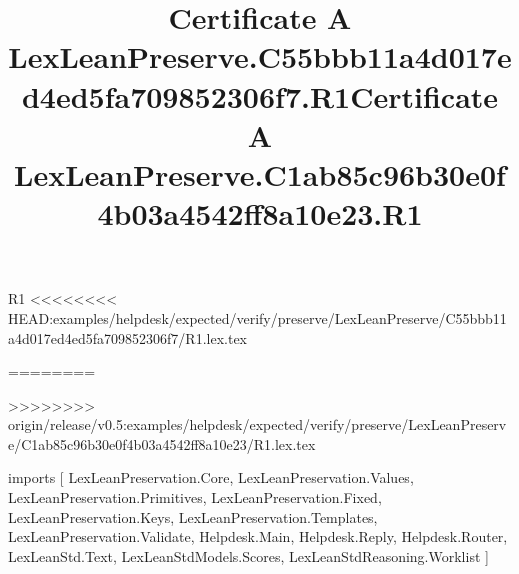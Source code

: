 \begin{lexlean}{R1}
<<<<<<<< HEAD:examples/helpdesk/expected/verify/preserve/LexLeanPreserve/C55bbb11a4d017ed4ed5fa709852306f7/R1.lex.tex
\title{Certificate A LexLeanPreserve.C55bbb11a4d017ed4ed5fa709852306f7.R1}
========
\title{Certificate A LexLeanPreserve.C1ab85c96b30e0f4b03a4542ff8a10e23.R1}
>>>>>>>> origin/release/v0.5:examples/helpdesk/expected/verify/preserve/LexLeanPreserve/C1ab85c96b30e0f4b03a4542ff8a10e23/R1.lex.tex
\begin{coremodule}
imports [
  LexLeanPreservation.Core,
  LexLeanPreservation.Values,
  LexLeanPreservation.Primitives,
  LexLeanPreservation.Fixed,
  LexLeanPreservation.Keys,
  LexLeanPreservation.Templates,
  LexLeanPreservation.Validate,
  Helpdesk.Main,
  Helpdesk.Reply,
  Helpdesk.Router,
  LexLeanStd.Text,
  LexLeanStdModels.Scores,
  LexLeanStdReasoning.Worklist
]


\end{coremodule}
\end{lexlean}
